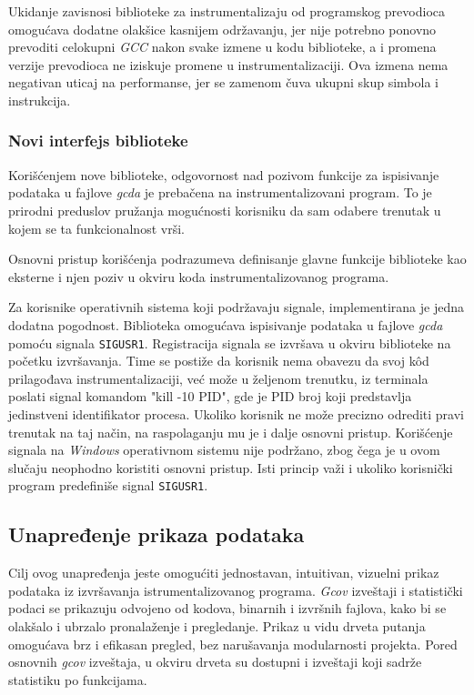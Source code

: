 \documentclass[12pt,oneside]{memoir}
\newcommand{\kod}[1]{\texttt{#1}}
\newcommand{\strano}[1]{\textit{#1}}
\begin{document}
Ukidanje zavisnosi biblioteke za instrumentalizaju od programskog prevodioca omogućava dodatne olakšice kasnijem održavanju, jer nije potrebno ponovno prevoditi celokupni \strano{GCC} nakon svake izmene u kodu biblioteke, a i promena verzije prevodioca ne iziskuje promene u instrumentalizaciji. Ova izmena nema negativan uticaj na performanse, jer se zamenom čuva ukupni skup simbola i instrukcija. 


\subsubsection{Novi interfejs biblioteke}


Korišćenjem nove biblioteke, odgovornost nad pozivom funkcije za ispisivanje podataka u fajlove \strano{gcda} je prebačena na instrumentalizovani program. To je prirodni preduslov pružanja mogućnosti korisniku da sam odabere trenutak u kojem se ta funkcionalnost vrši. 

Osnovni pristup korišćenja podrazumeva definisanje glavne funkcije biblioteke kao eksterne i njen poziv u okviru koda instrumentalizovanog programa. 

Za korisnike operativnih sistema koji podržavaju signale, implementirana je jedna dodatna pogodnost. Biblioteka omogućava ispisivanje podataka u fajlove \strano{gcda} pomoću signala \kod{SIGUSR1}. Registracija signala se izvršava u okviru biblioteke na početku izvršavanja. Time se postiže da korisnik nema obavezu da svoj k\^{o}d prilagođava instrumentalizaciji, već može u željenom trenutku, iz terminala poslati signal komandom "kill -10 PID", gde je PID broj koji predstavlja jedinstveni identifikator procesa. Ukoliko korisnik ne može precizno odrediti pravi trenutak na taj način, na raspolaganju mu je i dalje osnovni pristup. Korišćenje signala na \strano{Windows} operativnom sistemu nije podržano, zbog čega je u ovom slučaju neophodno koristiti osnovni pristup. Isti princip važi i ukoliko korisnički program predefiniše signal \kod{SIGUSR1}.


\subsection{Unapređenje prikaza podataka}


Cilj ovog unapređenja jeste omogućiti jednostavan, intuitivan, vizuelni prikaz podataka iz izvršavanja istrumentalizovanog programa. \strano{Gcov} izveštaji i statistički podaci se prikazuju odvojeno od kodova, binarnih i izvršnih fajlova, kako bi se olakšalo i ubrzalo pronalaženje i pregledanje. Prikaz u vidu drveta putanja omogućava brz i efikasan pregled, bez narušavanja modularnosti projekta. Pored osnovnih \strano{gcov} izveštaja, u okviru drveta su dostupni i izveštaji koji sadrže statistiku po funkcijama. 
\end{document}
